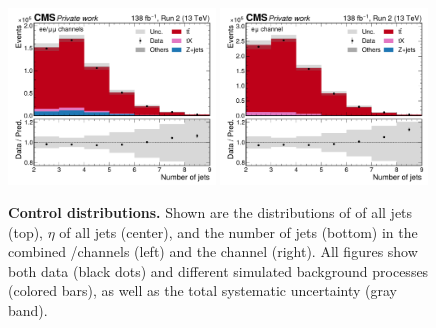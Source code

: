 \begin{figure}[!hp]
    \includegraphics[width=0.49\textwidth]{figures/ah/controlplots/ReqMET/njet__sf.pdf}
    \hfill
    \includegraphics[width=0.49\textwidth]{figures/ah/controlplots/ReqMET/njet__em.pdf}
    \caption{
        \textbf{Control distributions.} Shown are the distributions of \pt of all jets (top), $\eta$ of all jets (center), and the number of jets (bottom) in the combined \ee/\mumu channels (left) and the \emu channel (right). All figures show both data (black dots) and different simulated background processes (colored bars), as well as the total systematic uncertainty (gray band). 
    }
    \label{fig:ah:control2}
\end{figure}

